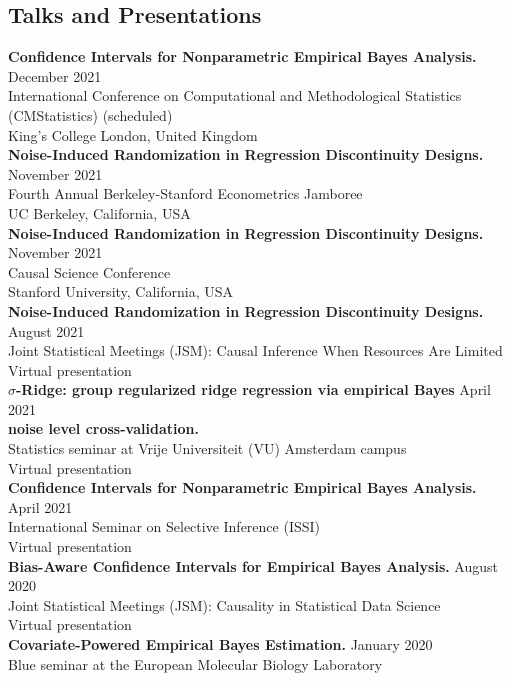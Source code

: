 \documentclass[margin,line]{res}
\begin{document}
\begin{resume}
\section{\sc Talks and Presentations}
\textbf{Confidence Intervals for Nonparametric Empirical Bayes Analysis.} \hfill December 2021\\
International Conference on Computational and Methodological Statistics (CMStatistics) \hfill (scheduled)\\
King's College London, United Kingdom\\
\textbf{Noise-Induced Randomization in Regression Discontinuity Designs.}  \hfill November 2021\\
Fourth Annual Berkeley-Stanford Econometrics Jamboree \\
UC Berkeley, California, USA \\
\textbf{Noise-Induced Randomization in Regression Discontinuity Designs.}  \hfill November 2021\\
Causal Science Conference\\
Stanford University, California, USA\\
\textbf{Noise-Induced Randomization in Regression Discontinuity Designs.} \hfill August 2021\\
Joint Statistical Meetings (JSM): Causal Inference When Resources Are Limited\\
Virtual presentation\\
\textbf{$\sigma$-Ridge: group regularized ridge regression via empirical Bayes} \hfill April 2021\\
 \textbf{noise level cross-validation.}\\
Statistics seminar at Vrije Universiteit (VU) Amsterdam campus\\
Virtual presentation\\
\textbf{Confidence Intervals for Nonparametric Empirical Bayes Analysis.} \hfill April 2021\\
International Seminar on Selective Inference (ISSI)\\
Virtual presentation\\
\textbf{Bias-Aware Confidence Intervals for Empirical Bayes Analysis.} \hfill August 2020\\
Joint Statistical Meetings (JSM): Causality in Statistical Data Science\\
Virtual presentation\\
\textbf{Covariate-Powered Empirical Bayes Estimation.} \hfill January 2020\\
Blue seminar at the European Molecular Biology Laboratory\\

\end{resume}
\end{document}
